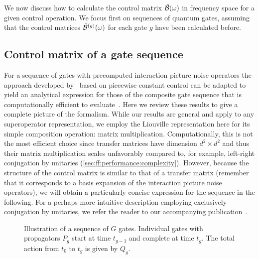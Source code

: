 We now discuss how to calculate the control matrix $\tilde{\mathcal{B}}(\omega)$ in frequency space for a given control operation.
We focus first on sequences of quantum gates, assuming that the control matrices $\tilde{\mathcal{B}}^{(g)}(\omega)$ for each gate $g$ have been calculated before.

\subsection{Control matrix of a gate sequence}\label{sec:ff:theory:control_matrix:sequence}
For a sequence of gates with precomputed interaction picture noise operators the approach developed by~\citeauthor{Green2013} based on piecewise constant control can be adapted to yield an analytical expression for those of the composite gate sequence that is computationally efficient to evaluate~\cite{Cerfontaine2021}.
Here we review these results to give a complete picture of the formalism.
While our results are general and apply to any superoperator representation, we employ the Liouville representation here for its simple composition operation: matrix multiplication.
Computationally, this is not the most efficient choice since transfer matrices have dimension $d^2\times d^2$ and thus their matrix multiplication scales unfavorably compared to, for example, left-right conjugation by unitaries (\cf \cref{sec:ff:performance:complexity}).
However, because the structure of the control matrix \ctrlmat is similar to that of a transfer matrix (remember that it corresponds to a basis expansion of the interaction picture noise operators), we will obtain a particularly concise expression for the sequence in the following.
For a perhaps more intuitive description employing exclusively conjugation by unitaries, we refer the reader to our accompanying publication~.

\begin{figure}
    \centering
    
    \caption[Illustration of gate sequence]{
        Illustration of a sequence of $G$ gates.
        Individual gates with propagators $P_g$ start at time $t_{g-1}$ and complete at time $t_g$.
        The total action from $t_0$ to $t_g$ is given by $Q_g$.
    }
    \label{fig:ff:gatesequence}
\end{figure}

